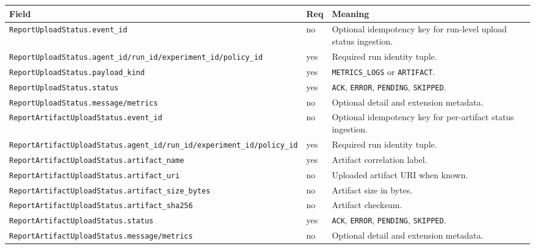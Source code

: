 \documentclass[11pt,a4paper]{article}
\begin{document}
\begin{longtable}{p{4.1cm}p{1.6cm}p{9.3cm}}
\textbf{Field} & \textbf{Req} & \textbf{Meaning} \\
\hline
\endhead
\texttt{ReportUploadStatus.event\_id} & no & Optional idempotency key for run-level upload status ingestion. \\
\texttt{ReportUploadStatus.agent\_id/run\_id/experiment\_id/policy\_id} & yes & Required run identity tuple. \\
\texttt{ReportUploadStatus.payload\_kind} & yes & \texttt{METRICS\_LOGS} or \texttt{ARTIFACT}. \\
\texttt{ReportUploadStatus.status} & yes & \texttt{ACK}, \texttt{ERROR}, \texttt{PENDING}, \texttt{SKIPPED}. \\
\texttt{ReportUploadStatus.message/metrics} & no & Optional detail and extension metadata. \\
\texttt{ReportArtifactUploadStatus.event\_id} & no & Optional idempotency key for per-artifact status ingestion. \\
\texttt{ReportArtifactUploadStatus.agent\_id/run\_id/experiment\_id/policy\_id} & yes & Required run identity tuple. \\
\texttt{ReportArtifactUploadStatus.artifact\_name} & yes & Artifact correlation label. \\
\texttt{ReportArtifactUploadStatus.artifact\_uri} & no & Uploaded artifact URI when known. \\
\texttt{ReportArtifactUploadStatus.artifact\_size\_bytes} & no & Artifact size in bytes. \\
\texttt{ReportArtifactUploadStatus.artifact\_sha256} & no & Artifact checksum. \\
\texttt{ReportArtifactUploadStatus.status} & yes & \texttt{ACK}, \texttt{ERROR}, \texttt{PENDING}, \texttt{SKIPPED}. \\
\texttt{ReportArtifactUploadStatus.message/metrics} & no & Optional detail and extension metadata. \\
\hline
\end{longtable}
\end{document}
